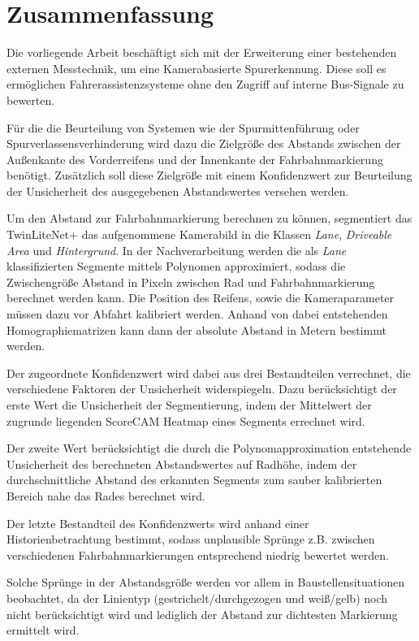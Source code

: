 \chapter{Zusammenfassung} 

Die vorliegende Arbeit beschäftigt sich mit der Erweiterung einer bestehenden externen Messtechnik, um eine Kamerabasierte Spurerkennung.
Diese soll es ermöglichen Fahrerassistenzsysteme ohne den Zugriff auf interne Bus-Signale zu bewerten. 

Für die die Beurteilung von Systemen wie der Spurmittenführung oder Spurverlassensverhinderung wird dazu die Zielgrö{\ss}e des Abstands zwischen der Au{\ss}enkante des Vorderreifens und der Innenkante der Fahrbahnmarkierung benötigt.
Zusätzlich soll diese Zielgrö{\ss}e mit einem Konfidenzwert zur Beurteilung der Unsicherheit des ausgegebenen Abstandswertes versehen werden.

Um den Abstand zur Fahrbahnmarkierung berechnen zu können, segmentiert das TwinLiteNet+ das aufgenommene Kamerabild in die Klassen \textit{Lane}, \textit{Driveable Area} und \textit{Hintergrund}. 
In der Nachverarbeitung werden die als \textit{Lane} klassifizierten Segmente mittels Polynomen approximiert, sodass die Zwischengrö{\ss}e Abstand in Pixeln zwischen Rad und Fahrbahnmarkierung berechnet werden kann.
Die Position des Reifens, sowie die Kameraparameter müssen dazu vor Abfahrt kalibriert werden. Anhand von dabei entstehenden Homographiematrizen kann dann der absolute Abstand in Metern bestimmt werden.

Der zugeordnete Konfidenzwert wird dabei aus drei Bestandteilen verrechnet, die verschiedene Faktoren der Unsicherheit widerspiegeln. Dazu berücksichtigt der erste Wert die Unsicherheit der Segmentierung, indem der Mittelwert der zugrunde liegenden ScoreCAM Heatmap eines Segments errechnet wird.

Der zweite Wert berücksichtigt die durch die Polynomapproximation entstehende Unsicherheit des berechneten Abstandswertes auf Radhöhe, indem der durchschnittliche Abstand des erkannten Segments zum sauber kalibrierten Bereich nahe das Rades berechnet wird.

Der letzte Bestandteil des Konfidenzwerts wird anhand einer Historienbetrachtung bestimmt, sodass unplausible Sprünge z.B. zwischen verschiedenen Fahrbahnmarkierungen entsprechend niedrig bewertet werden.

Solche Sprünge in der Abstandsgrö{\ss}e werden vor allem in Baustellensituationen beobachtet, da der Linientyp (gestrichelt/durchgezogen und wei{\ss}/gelb) noch nicht berücksichtigt wird und lediglich der Abstand zur dichtesten Markierung ermittelt wird.

